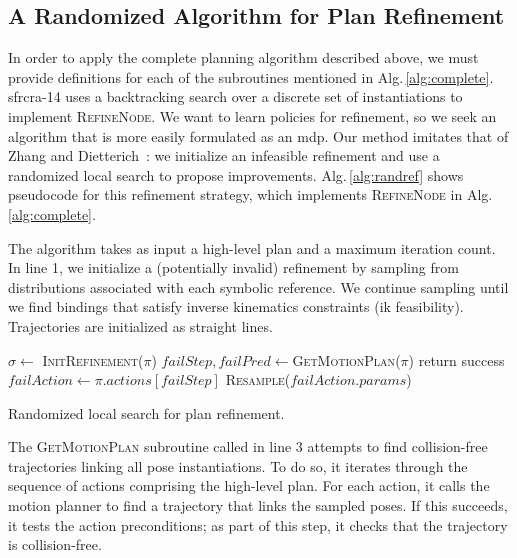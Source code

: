 \subsection{A Randomized Algorithm for Plan Refinement}
In order to apply the complete planning algorithm described above, we
must provide definitions for each of the subroutines mentioned in
Alg.\,\ref{alg:complete}. {\sc sfrcra-14} uses a backtracking search
over a discrete set of instantiations to implement
\textsc{RefineNode}. We want to learn policies for refinement, so we
seek an algorithm that is more easily formulated as an {\sc mdp}. Our
method imitates that of Zhang and Dietterich~\cite{JobShopSched}: we
initialize an infeasible refinement and use a randomized local search
to propose improvements. Alg.\,\ref{alg:randref} shows pseudocode for
this refinement strategy, which implements \textsc{RefineNode} in
Alg.\,\ref{alg:complete}.

The algorithm takes as input a high-level plan and a maximum iteration
count.  In line 1, we initialize a (potentially invalid) refinement by
sampling from distributions associated with each symbolic
reference. We continue sampling until we find bindings that satisfy
inverse kinematics constraints ({\sc ik} feasibility). Trajectories
are initialized as straight lines.

\begin{algorithm}[t]
\begin{small}
  \SetAlgoLined
  \DontPrintSemicolon
   {
  \nl $\sigma \leftarrow$ \textsc{InitRefinement}($\pi$)\;
  \nl {} {
  \nl $failStep, failPred \leftarrow $\textsc{GetMotionPlan}($\pi$)\;
  \nl {} {
  \nl return success }
  \nl {} {
  \nl $failAction \leftarrow \pi.actions[failStep]$\;
  \nl \textsc{Resample}($failAction.params$) }
  \nl {} }}

\end{small}
\caption{Randomized local search for plan refinement.}
\label{alg:randref}
\end{algorithm}

The \textsc{GetMotionPlan} subroutine called in line 3 attempts to
find collision-free trajectories linking all pose instantiations.
To do so, it iterates through the sequence of actions comprising the high-level plan.
For each action, it calls the motion planner to find a trajectory
that links the sampled poses. If this succeeds, it tests the action preconditions;
as part of this step, it checks that the trajectory is collision-free.

